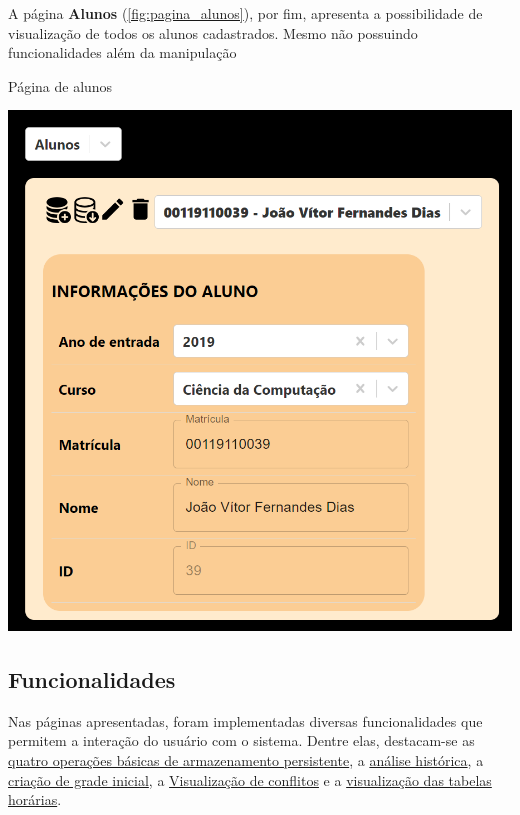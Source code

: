 A página \textbf{Alunos} (\autoref{fig:pagina_alunos}), por fim, apresenta a possibilidade de visualização de todos os alunos cadastrados. Mesmo não possuindo funcionalidades além da manipulação

\begin{MyCenteredFigure} \caption{Página de alunos} \label{fig:pagina_alunos}
  \includegraphics[width=\textwidth]{files/img/2.02!7-resultados/10-Aluno.png}
\end{MyCenteredFigure}

\subsection{Funcionalidades} \label{ssec:funcionalidades}

Nas páginas apresentadas, foram implementadas diversas funcionalidades que permitem a interação do usuário com o sistema. Dentre elas, destacam-se as \hyperref[sssec:CRUD]{quatro operações básicas de armazenamento persistente}, a \hyperref[sssec:Análise histórica]{análise histórica}, a \hyperref[sssec:Criação de grade inicial]{criação de grade inicial}, a \hyperref[sssec:Visualização de conflitos]{Visualização de conflitos} e a \hyperref[sssec:Visualização de tabelas horárias]{visualização das tabelas horárias}.

